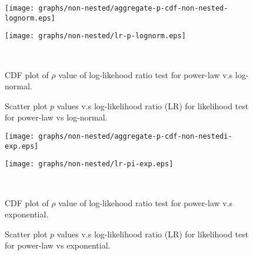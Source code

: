\documentclass[paper]{ieice}
\begin{document}
\begin{figure*}[!tb]
\centering
\begin{minipage}[b]{.45\linewidth}
\centering
\texttt{[image: graphs/non-nested/aggregate-p-cdf-non-nested-lognorm.eps]}
\end{minipage}%
\hfill%
\begin{minipage}[b]{.45\linewidth}
\centering
\centering
\texttt{[image: graphs/non-nested/lr-p-lognorm.eps]}
\end{minipage}\\[-7pt]
\begin{minipage}[t]{.45\linewidth}
\caption{CDF plot of $\rho$ value of log-likehood ratio test for power-law v.s 
         log-normal.} %
\label{fig:cdf-p-lognorm}
\end{minipage}%
\hfill%
\begin{minipage}[t]{.45\linewidth}
\caption{Scatter plot $p$ values v.s log-likelihood
         ratio (LR) for likelihood test for power-law vs log-normal.} 
\label{fig:scatter-lognorm}
\end{minipage}%
\vspace{-2mm}
\end{figure*}

\begin{figure*}[!tb]
\centering
\begin{minipage}[b]{.45\linewidth}
\centering
\texttt{[image: graphs/non-nested/aggregate-p-cdf-non-nestedi-exp.eps]}
\end{minipage}%
\hfill%
\begin{minipage}[b]{.45\linewidth}
\centering
\centering
\texttt{[image: graphs/non-nested/lr-pi-exp.eps]}
\end{minipage}\\[-7pt]
\begin{minipage}[t]{.45\linewidth}
\caption{CDF plot of $\rho$ value of log-likehood ratio test for power-law v.s exponential.} 
\label{fig:cdf-p-exp}
\end{minipage}%
\hfill%
\begin{minipage}[t]{.45\linewidth}
\caption{Scatter plot $p$ values v.s log-likelihood 
         ratio (LR) for likelihood test for power-law vs exponential.} 
\label{fig:scatter-exp}
\end{minipage}%
\vspace{-2mm}
\end{figure*}
\end{document}
